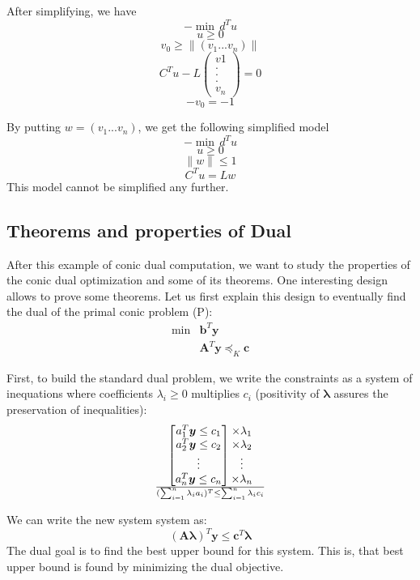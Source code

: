 \begin{leftbar}
 After simplifying, we have \\
 $$-\min \, d^Tu$$
 $$u \geq 0$$
 $$v_0 \geq \parallel (v_1 ... v_n) \parallel$$
 $$C^Tu - L\begin{pmatrix}
 v1\\ 
 .\\
 .\\
 .\\
 v_n
 \end{pmatrix} = 0 $$
 $$-v_0=-1$$
 
 By putting $w=(v_1 ... v_n)$, we get the following simplified model 
$$-\min \, d^Tu$$
$$u \geq 0$$
$$\parallel w \parallel \leq 1$$
$$C^Tu = Lw$$
This model cannot be simplified any further. 

\end{leftbar}


\subsection{Theorems and properties of Dual}
After this example of conic dual computation, we want to study the properties of the conic dual optimization and some of its theorems. One interesting design allows to prove some theorems. Let us first explain this design to eventually find the dual of the primal conic problem (P):
\begin{align*}
\min&\textbf{b}^T\textbf{y}\\
             &\textbf{A}^T\textbf{y}\preceq_K \textbf{c}
\end{align*}

First, to build the standard dual problem, we write the constraints as a system of inequations where coefficients $\lambda_i \geq 0$ multiplies $c_i$ (positivity of $\boldsymbol{\lambda}$ assures the preservation of inequalities):
\[\begin{bmatrix}
 a_1^T \boldsymbol{y} \leq c_1\\
 a_2^T \boldsymbol{y} \leq c_2\\
 \vdots\\
 a_n^T \boldsymbol{y} \leq c_n
\end{bmatrix}
\begin{matrix}
 \times \lambda_1\\
 \times \lambda_2\\
 \vdots\\
 \times \lambda_n
\end{matrix}
\over
(\sum_{i=1}^{n}\lambda_i a_i)^T \leq \sum_{i=1}^{n}\lambda_i c_i\]

We can write the new system system as:
\[(\boldsymbol{A}\boldsymbol{\lambda})^T \boldsymbol{y} \leq \boldsymbol{c}^T \boldsymbol{\lambda}
\]
The dual goal is to find the best upper bound for this system. This is, that best upper bound is found by minimizing the dual objective.\\

